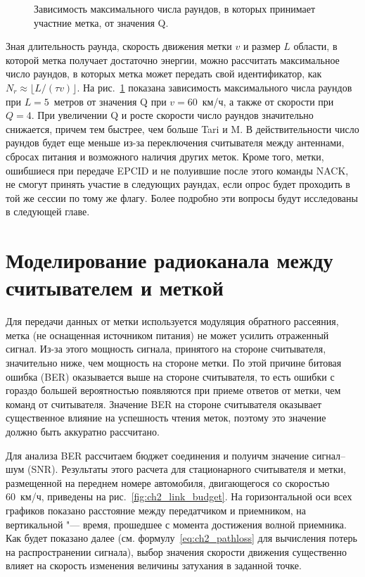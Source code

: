 \begin{figure}[h]
	\caption{Зависимость максимального числа раундов, в которых принимает участние метка, от значения Q.}
	\label{fig:ch2_max_num_rounds}
\end{figure}

Зная длительность раунда, скорость движения метки $v$ и размер $L$ области, в которой метка получает достаточно энергии, можно рассчитать максимальное число раундов, в которых метка может передать свой идентификатор, как $N_r \approx \lfloor L / (\tau v) \rfloor$. На рис.~\ref{fig:ch2_max_num_rounds} показана зависимость максимального числа раундов при $L = 5$~метров от значения Q при $v = 60$~км/ч, а также от скорости при $Q = 4$. При увеличении Q и росте скорости число раундов значительно снижается, причем тем быстрее, чем больше Tari и M. В действительности число раундов будет еще меньше из-за переключения считывателя между антеннами, сбросах питания и возможного наличия других меток. Кроме того, метки, ошибшиеся при передаче EPCID и не полуившие после этого команды NACK, не смогут принять участие в следующих раундах, если опрос будет проходить в той же сессии по тому же флагу. Более подробно эти вопросы будут исследованы в следующей главе.




\section{Моделирование радиоканала между считывателем и меткой}\label{sec:ch2_channel}
Для передачи данных от метки используется модуляция обратного рассеяния, метка (не оснащенная источником питания) не может усилить отраженный сигнал. Из-за этого мощность сигнала, принятого на стороне считывателя, значительно ниже, чем мощность на стороне метки. По этой причине битовая ошибка (BER) оказывается выше на стороне считывателя, то есть ошибки с гораздо большей вероятностью появляются при приеме ответов от метки, чем команд от считывателя. Значение BER на стороне считывателя оказывает существенное влияние на успешность чтения меток, поэтому это значение должно быть аккуратно рассчитано.

Для анализа BER рассчитаем бюджет соединения и полуичм значение сигнал--шум (SNR). Результаты этого расчета для стационарного считывателя и метки, размещенной на переднем номере автомобиля, двигающегося со скоростью 60~км/ч, приведены на рис.~\ref{fig:ch2_link_budget}. На горизонтальной оси всех графиков показано расстояние между передатчиком и приемником, на вертикальной "--- время, прошедшее с момента достижения волной приемника. Как будет показано далее (см. формулу~\eqref{eq:ch2_pathloss} для вычисления потерь на распространении сигнала), выбор значения скорости движения существенно влияет на скорость изменения величины затухания в заданной точке.


